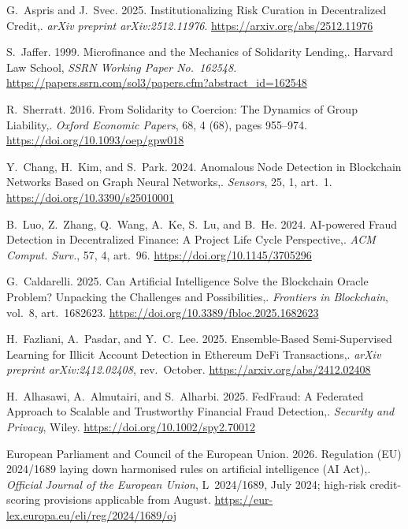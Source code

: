 {\begin{enumerate}[label={[\arabic*]}]
\item G.~Aspris and J.~Svec. 2025. Institutionalizing Risk Curation in Decentralized Credit,. \emph{arXiv preprint arXiv:2512.11976}. \url{https://arxiv.org/abs/2512.11976}

\item S.~Jaffer. 1999. Microfinance and the Mechanics of Solidarity Lending,. Harvard Law School, \emph{SSRN Working Paper No.~162548}. \url{https://papers.ssrn.com/sol3/papers.cfm?abstract_id=162548}

\item R.~Sherratt. 2016. From Solidarity to Coercion: The Dynamics of Group Liability,. \emph{Oxford Economic Papers}, 68, 4 (68), pages 955--974. \url{https://doi.org/10.1093/oep/gpw018}

\item Y.~Chang, H.~Kim, and S.~Park. 2024. Anomalous Node Detection in Blockchain Networks Based on Graph Neural Networks,. \emph{Sensors}, 25, 1, art.~1. \url{https://doi.org/10.3390/s25010001}

\item B.~Luo, Z.~Zhang, Q.~Wang, A.~Ke, S.~Lu, and B.~He. 2024. AI-powered Fraud Detection in Decentralized Finance: A Project Life Cycle Perspective,. \emph{ACM Comput. Surv.}, 57, 4, art.~96. \url{https://doi.org/10.1145/3705296}

\item G.~Caldarelli. 2025. Can Artificial Intelligence Solve the Blockchain Oracle Problem? Unpacking the Challenges and Possibilities,. \emph{Frontiers in Blockchain}, vol.~8, art.~1682623. \url{https://doi.org/10.3389/fbloc.2025.1682623}

\item H.~Fazliani, A.~Pasdar, and Y.~C.~Lee. 2025. Ensemble-Based Semi-Supervised Learning for Illicit Account Detection in Ethereum DeFi Transactions,. \emph{arXiv preprint arXiv:2412.02408}, rev.~October. \url{https://arxiv.org/abs/2412.02408}

\item H.~Alhasawi, A.~Almutairi, and S.~Alharbi. 2025. FedFraud: A Federated Approach to Scalable and Trustworthy Financial Fraud Detection,. \emph{Security and Privacy}, Wiley. \url{https://doi.org/10.1002/spy2.70012}

\item European Parliament and Council of the European Union. 2026. Regulation (EU) 2024/1689 laying down harmonised rules on artificial intelligence (AI Act),. \emph{Official Journal of the European Union}, L~2024/1689, July 2024; high-risk credit-scoring provisions applicable from August. \url{https://eur-lex.europa.eu/eli/reg/2024/1689/oj}


\end{enumerate}}
